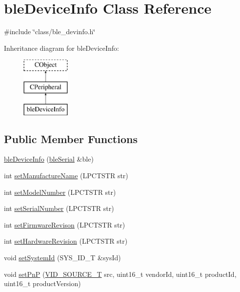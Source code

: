 \hypertarget{classble_device_info}{\section{ble\-Device\-Info Class Reference}
\label{classble_device_info}
}


{\ttfamily \#include \char`\"{}class/ble\-\_\-devinfo.\-h\char`\"{}}

Inheritance diagram for ble\-Device\-Info\-:\begin{figure}[H]
\begin{center}
\leavevmode
\includegraphics[height=3.000000cm]{d3/dc5/classble_device_info}
\end{center}
\end{figure}
\subsection*{Public Member Functions}
\begin{DoxyCompactItemize}
\item 
\hyperlink{classble_device_info_ae5f10713f4db98be9245aff3d482d51d}{ble\-Device\-Info} (\hyperlink{classble_serial}{ble\-Serial} \&ble)
\item 
int \hyperlink{classble_device_info_a98d7f5689f1e769f396282e3511edb99}{set\-Manufacture\-Name} (L\-P\-C\-T\-S\-T\-R str)
\item 
int \hyperlink{classble_device_info_a9e6a9696bb974ba0175968b3057e68d0}{set\-Model\-Number} (L\-P\-C\-T\-S\-T\-R str)
\item 
int \hyperlink{classble_device_info_a03fce5e655451a1245643987ca15ba71}{set\-Serial\-Number} (L\-P\-C\-T\-S\-T\-R str)
\item 
int \hyperlink{classble_device_info_a0e8825ee5d745fafdca6525fa2c230e7}{set\-Firmware\-Revison} (L\-P\-C\-T\-S\-T\-R str)
\item 
int \hyperlink{classble_device_info_aa2a08fe14dd55d02255719a1d29a484f}{set\-Hardware\-Revision} (L\-P\-C\-T\-S\-T\-R str)
\item 
void \hyperlink{classble_device_info_a372ab0246f7e19548fcef771e06dc407}{set\-System\-Id} (S\-Y\-S\-\_\-\-I\-D\-\_\-\-T \&sys\-Id)
\item 
void \hyperlink{classble_device_info_a344d50adf41337464686f926c8c85748}{set\-Pn\-P} (\hyperlink{group___enumerations_ga42b352f4817787f82d2adcffd4793ad9}{V\-I\-D\-\_\-\-S\-O\-U\-R\-C\-E\-\_\-\-T} src, uint16\-\_\-t vendor\-Id, uint16\-\_\-t product\-Id, uint16\-\_\-t product\-Version)
\end{DoxyCompactItemize}


